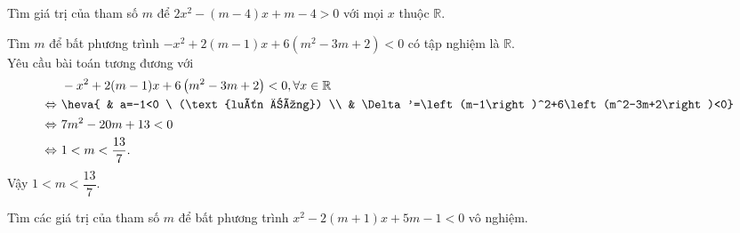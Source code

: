 \begin{bt}%
	Tìm giá trị của tham số $m$ để $2x^2-(m-4)x+m-4>0$ với mọi $x$ thuộc $\mathbb{R}$.
\end{bt}

\begin{bt}%
Tìm $m$ để bất phương trình $-x^2+2(m-1)x+6\left(m^2-3m+2\right)<0$ có tập nghiệm là $\mathbb{R}$.
\loigiai
{\\
Yêu cầu bài toán tương đương với
$$\begin{aligned}
& \ -x^2+2(m-1)x+6\left(m^2-3m+2\right)<0, \forall x\in\mathbb{R} \\
\Leftrightarrow & \ \heva{ & a=-1<0 \ (\text{luôn đúng}) \\ & \Delta'=\left(m-1\right)^2+6\left(m^2-3m+2\right)<0} \\
\Leftrightarrow & \ 7m^2-20m+13<0 \\
\Leftrightarrow & \ 1<m<\dfrac{13}{7}.
\end{aligned}$$
Vậy $1<m<\dfrac{13}{7}$.
}
\end{bt}

\begin{bt}%
	Tìm các giá trị của tham số $m$ để bất phương trình $x^2-2(m+1)x+5m-1<0$ vô nghiệm.
\end{bt}

